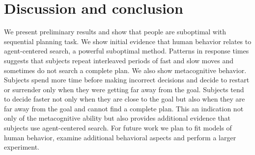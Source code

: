 \documentclass[10pt,letterpaper]{article}
\begin{document}
\section{Discussion and conclusion}
\vspace{-0.2cm}
We present preliminary results and show that people are suboptimal with sequential planning task. We show initial evidence that human behavior relates to agent-centered search, a powerful suboptimal method. Patterns in response times suggests that subjects repeat interleaved periods of fast and slow moves and sometimes do not search a complete plan. We also show metacognitive behavior. Subjects spend more time before making incorrect decisions and decide to restart or surrender only when they were getting far away from the goal. 
Subjects tend to decide faster not only when they are close to the goal but also when they are far away from the goal and cannot find a complete plan. 
This an indication not only of the metacognitive ability but also provides additional evidence that subjects use agent-centered search.
For future work we plan to fit models of human behavior, examine additional behavioral aspects and perform a larger experiment.
\end{document}
